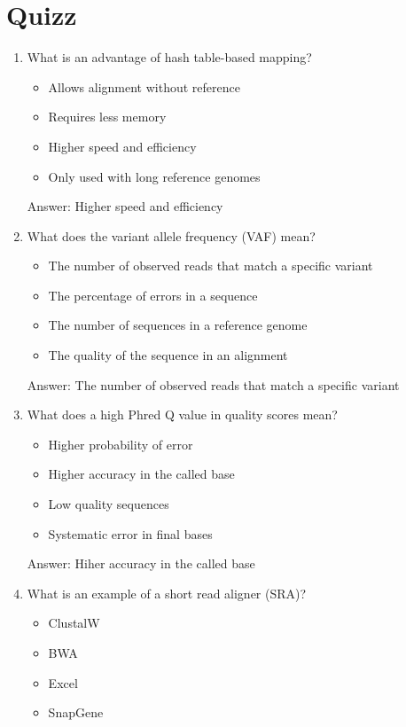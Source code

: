 \section{Quizz}
\begin{enumerate}
\item What is an advantage of hash table-based mapping?
\begin{itemize}
\item Allows alignment without reference
\item Requires less memory
\item Higher speed and efficiency
\item Only used with long reference genomes
\end{itemize}

Answer: Higher speed and efficiency

\item What does the variant allele frequency (VAF) mean?
\begin{itemize}
\item The number of observed reads that match a specific variant
\item The percentage of errors in a sequence
\item The number of sequences in a reference genome
\item The quality of the sequence in an alignment
\end{itemize}

Answer: The number of observed reads that match a specific variant

\item What does a high Phred Q value in quality scores mean?
\begin{itemize}
\item Higher probability of error
\item Higher accuracy in the called base
\item Low quality sequences
\item Systematic error in final bases
\end{itemize}

Answer: Hiher accuracy in the called base

\item What is an example of a short read aligner (SRA)?
\begin{itemize}
\item ClustalW
\item BWA
\item Excel
\item SnapGene
\end{itemize}


\end{enumerate}
